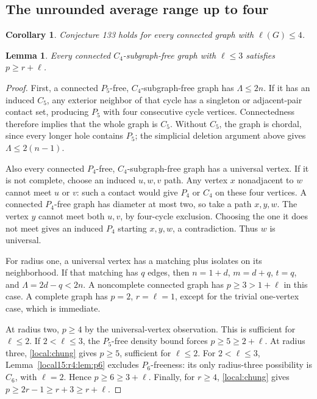 \documentclass[11pt,a4paper]{article}
\newtheorem{lemma}[theorem]{Lemma}
\newtheorem{corollary}[theorem]{Corollary}
\theoremstyle{definition}\newtheorem{definition}[theorem]{Definition}
\theoremstyle{remark}\newtheorem{remark}[theorem]{Remark}
\begin{document}
\subsection{The unrounded average range up to four}
\begin{corollary}\label{local15:cor:four}
Conjecture 133 holds for every connected graph with $\ell(G)\le4$.
\end{corollary}
\begin{lemma}\label{local15:lem:small}
Every connected $C_4$-subgraph-free graph with $\ell\le3$ satisfies
$p\ge r+\ell$.
\end{lemma}
\begin{proof}
First, a connected $P_5$-free, $C_4$-subgraph-free graph has $\Lambda\le2n$.
If it has an induced $C_5$, any exterior neighbor of that cycle has a
singleton or adjacent-pair contact set, producing $P_5$ with four
consecutive cycle vertices. Connectedness therefore implies that the
whole graph is $C_5$. Without $C_5$, the graph is chordal, since every
longer hole contains $P_5$; the simplicial deletion argument above gives
$\Lambda\le2(n-1)$.

Also every connected $P_4$-free, $C_4$-subgraph-free graph has a universal
vertex. If it is not complete, choose an induced $u,w,v$ path.
Any vertex $x$ nonadjacent to $w$ cannot meet $u$ or $v$: such a contact
would give $P_4$ or $C_4$ on these four vertices. A connected $P_4$-free
graph has diameter at most two, so take a path $x,y,w$. The vertex $y$
cannot meet both $u,v$, by four-cycle exclusion. Choosing the one it
does not meet gives an induced $P_4$ starting $x,y,w$, a contradiction.
Thus $w$ is universal.

For radius one, a universal vertex has a matching plus isolates on
its neighborhood. If that matching has $q$ edges, then
$n=1+d$, $m=d+q$, $t=q$, and $\Lambda=2d-q<2n$.
A noncomplete connected graph has $p\ge3>1+\ell$ in this case.
A complete graph has $p=2$, $r=\ell=1$, except for the trivial
one-vertex case, which is immediate.

At radius two, $p\ge4$ by the universal-vertex observation. This is
sufficient for $\ell\le2$. If $2<\ell\le3$, the $P_5$-free density
bound forces $p\ge5\ge2+\ell$. At radius three, \eqref{local:chung}
gives $p\ge5$, sufficient for $\ell\le2$. For $2<\ell\le3$, Lemma~\ref{local15:r4:lem:p6} excludes $P_6$-freeness: its only radius-three possibility
is $C_6$, with $\ell=2$. Hence $p\ge6\ge3+\ell$. Finally, for
$r\ge4$, \eqref{local:chung} gives $p\ge2r-1\ge r+3\ge r+\ell$.
\end{proof}
\end{document}
